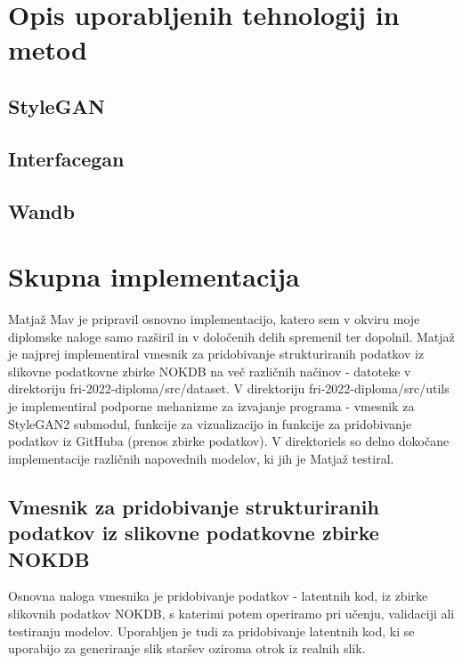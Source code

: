 \documentclass[a4paper,12pt,openright]{book}
\begin{document}
  
\section{Opis uporabljenih tehnologij in metod}
\subsection{StyleGAN}
\subsection{Interfacegan}
\subsection{Wandb}

\section{Skupna implementacija}
Matjaž Mav je pripravil osnovno implementacijo, katero sem v okviru moje diplomske naloge samo razširil in v določenih delih spremenil ter dopolnil. Matjaž je najprej implementiral vmesnik za pridobivanje strukturiranih podatkov iz slikovne podatkovne zbirke NOKDB na več različnih načinov - datoteke v direktoriju fri-2022-diploma/src/dataset. V direktoriju fri-2022-diploma/src/utils je implementiral podporne mehanizme za izvajanje programa - vmesnik za StyleGAN2 submodul, funkcije za vizualizacijo in funkcije za pridobivanje podatkov iz GitHuba (prenos zbirke podatkov). V direktoriels so delno dokočane implementacije različnih napovednih modelov, ki jih je Matjaž testiral.

\subsection{Vmesnik za pridobivanje strukturiranih podatkov iz slikovne podatkovne zbirke NOKDB}
Osnovna naloga vmesnika je pridobivanje podatkov - latentnih kod, iz zbirke slikovnih podatkov NOKDB, s katerimi potem operiramo pri učenju, validaciji ali testiranju modelov. Uporabljen je tudi za pridobivanje latentnih kod, ki se uporabijo za generiranje slik staršev oziroma otrok iz realnih slik. 
\end{document}
